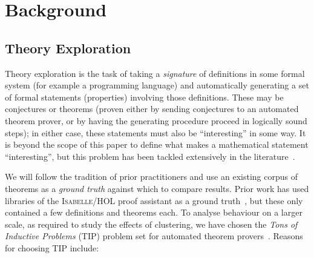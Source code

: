 \section{Background}
\label{sec:background}

\subsection{Theory Exploration}
\label{sec:theoryexploration}

Theory exploration is the task of taking a \emph{signature} of definitions in
some formal system (for example a programming language) and automatically
generating a set of formal statements (properties) involving those
definitions. These may be conjectures or theorems (proven either by sending
conjectures to an automated theorem prover, or by having the generating
procedure proceed in logically sound steps); in either case, these statements
must also be ``interesting'' in some way. It is beyond the scope of this paper
to define what makes a mathematical statement ``interesting'', but this problem
has been tackled extensively in the literature~\cite{colton2000notion}.

We will follow the tradition of prior practitioners and use an existing
corpus of theorems as a \emph{ground truth} against which to compare results.
Prior work has used libraries of the \textsc{Isabelle/HOL} proof assistant as a
ground
truth~\cite{Montano-Rivas.McCasland.Dixon.ea:2012,johansson2009isacosy,claessen2013automating},
but these only contained a few definitions and theorems each. To analyse
behaviour on a larger scale, as required to study the effects of clustering, we
have chosen the \emph{Tons of Inductive Problems} (TIP) problem set for
automated theorem provers~\cite{claessen2015tip}.  Reasons for choosing TIP
include:

